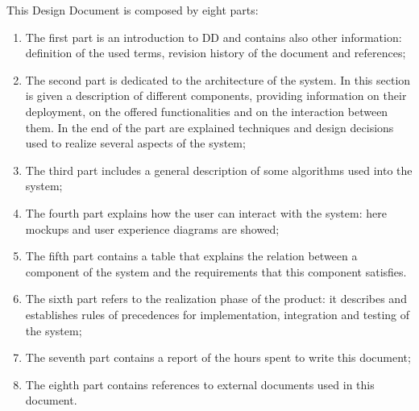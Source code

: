 This Design Document is composed by eight parts:
\begin{enumerate}
\item The first part is an introduction to DD and contains also other information: definition of the used terms, revision history of the document and references;
\item The second part is dedicated to the architecture of the system. In this section is given a description of different components, providing information on their deployment, on the offered functionalities and on the interaction between them. In the end of the part are explained techniques and design decisions used to realize several aspects of the system;
\item The third part includes a general description of some algorithms used into the system;
\item The fourth part explains how the user can interact with the system: here mockups and user experience diagrams are showed;
\item The fifth part contains a table that explains the relation between a component of the system and the requirements that this component satisfies.
\item The sixth part refers to the realization phase of the product: it describes and establishes rules of precedences for implementation, integration and testing of the system;
\item The seventh part contains a report of the hours spent to write this document;
\item The eighth part contains references to external documents used in this document.
\end{enumerate}
